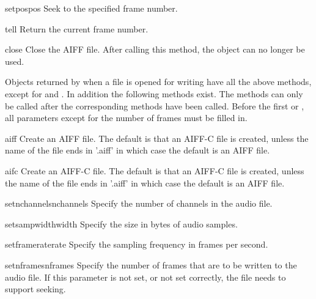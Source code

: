\begin{funcdesc}{setpos}{pos}
Seek to the specified frame number.
\end{funcdesc}

\begin{funcdesc}{tell}{}
Return the current frame number.
\end{funcdesc}

\begin{funcdesc}{close}{}
Close the AIFF file.  After calling this method, the object can no
longer be used.
\end{funcdesc}

Objects returned by  when a file is opened for
writing have all the above methods, except for  and
.  In addition the following methods exist.  The
 methods can only be called after the corresponding
 methods have been called.  Before the first
 or , all parameters except for
the number of frames must be filled in.

\begin{funcdesc}{aiff}{}
Create an AIFF file.  The default is that an AIFF-C file is created,
unless the name of the file ends in '.aiff' in which case the default
is an AIFF file.
\end{funcdesc}

\begin{funcdesc}{aifc}{}
Create an AIFF-C file.  The default is that an AIFF-C file is created,
unless the name of the file ends in '.aiff' in which case the default
is an AIFF file.
\end{funcdesc}

\begin{funcdesc}{setnchannels}{nchannels}
Specify the number of channels in the audio file.
\end{funcdesc}

\begin{funcdesc}{setsampwidth}{width}
Specify the size in bytes of audio samples.
\end{funcdesc}

\begin{funcdesc}{setframerate}{rate}
Specify the sampling frequency in frames per second.
\end{funcdesc}

\begin{funcdesc}{setnframes}{nframes}
Specify the number of frames that are to be written to the audio file.
If this parameter is not set, or not set correctly, the file needs to
support seeking.
\end{funcdesc}


